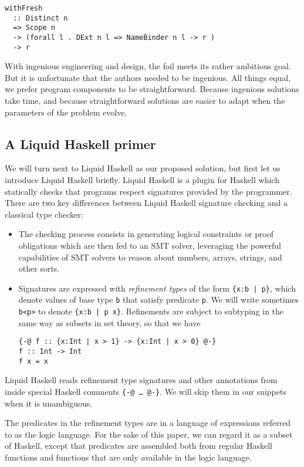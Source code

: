 \documentclass[sigconf, review]{acmart}
\newcommand{\tc}[1]{{\small\texttt{#1}}}
\begin{document}
\begin{verbatim}
withFresh
  :: Distinct n
  => Scope n
  -> (forall l . DExt n l => NameBinder n l -> r )
  -> r
\end{verbatim}

With ingenious engineering and design, the foil meets its rather ambitious goal.
But it is unfortunate that the authors needed to be ingenious. All things equal,
we prefer program components to be straightforward. Because ingenious solutions
take time, and because straightforward solutions are easier to adapt when the
parameters of the problem evolve.


\subsection{A Liquid Haskell primer}

We will turn next to Liquid Haskell as our proposed solution, but first let us
introduce Liquid Haskell briefly.
Liquid Haskell is a
plugin for Haskell which statically checks that programs respect signatures
provided by the programmer. There are two key differences between Liquid Haskell
signature checking and a classical type checker:

\begin{itemize}
  \item The checking process consists in generating logical constraints or proof
        obligations which are then fed to an SMT solver, leveraging the powerful
        capabilities of SMT solvers to reason about numbers, arrays, strings,
        and other sorts.
  \item Signatures are expressed with \emph{refinement types} of the form
        \tc{\{x:b | p\}}, which denote values of base type \tc{b} that
        satisfy predicate \tc{p}. We will write sometimes \tc{b<p>} to denote
        \tc{\{x:b | p x\}}.
Refinements are subject to subtyping in the same way as subsets in set
theory, so that we have
\begin{verbatim}
{-@ f :: {x:Int | x > 1} -> {x:Int | x > 0} @-}
f :: Int -> Int
f x = x
\end{verbatim}
\end{itemize}

Liquid Haskell reads refinement type signatures and other annotations from
inside special Haskell comments
\tc{\{-@ \ldots\ @-\}}. We will skip them in our snippets when it is unambiguous.

The predicates in the refinement types are in a language of expressions
referred to as the logic language. For the sake of this paper, we can
regard it as a subset of Haskell, except that predicates are assembled both from
regular Haskell functions and functions that are
only available in the logic language.
\end{document}
